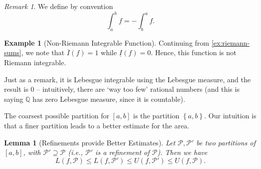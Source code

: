 \documentclass[11pt]{article}
\numberwithin{equation}{section}
\newtheorem{lemma}[theorem]{Lemma}
\theoremstyle{definition}
\newtheorem{example}[theorem]{Example}
\theoremstyle{remark}
\newtheorem{remark}[theorem]{Remark}
\newcommand{\pqty}[1]{\left(#1\right)}
\newcommand{\Bqty}[1]{\left\{#1\right\}}
\newcommand{\ccintv}[2]{[#1,#2]}
\newcommand{\QQ}{\mathbb Q}
\newcommand{\partition}{\mathcal P}
\newcommand{\upperSum}{U}
\newcommand{\lowerSum}{L}
\newcommand{\upperI}{\overline I}
\newcommand{\lowerI}{\underline I}
\begin{document}
\begin{remark}\label{analysis-unit-0142}
    We define by convention
    \[
        \int_{a}^{b} f = - \int_{b}^{a} f.
    \]
\end{remark}

\begin{example}[Non-Riemann Integrable Function]\label{analysis-unit-0143}
    \label{ex:non-riemann-integrable-fn}%
    Continuing from \autoref{ex:riemann-sums}, we note that \(\upperI\pqty{f} = 1\) while \(\lowerI\pqty{f} = 0\). Hence, this function is not Riemann integrable.
    
    Just as a remark, it is Lebesgue integrable using the Lebesgue measure, and the result is \(0\) -- intuitively, there are `way too few' rational numbers (and this is saying \(\QQ\) has zero Lebesgue measure, since it is countable).
\end{example}

The coarsest possible partition for \(\ccintv{a}{b}\) is the partition \(\Bqty{a, b}\). Our intuition is that a finer partition leads to a better estimate for the area.

\begin{lemma}[Refinements provide Better Estimates]\label{analysis-unit-0144}
    \label{lem:refinement-better-estimate}%
    Let \(\partition, \partition'\) be two partitions of \(\ccintv{a}{b}\), with \(\partition' \supseteq \partition\) (i.e., \(\partition'\) is a \emph{refinement} of \(\partition\)). Then we have
    \[
        \lowerSum\pqty{f, \partition} \leq \lowerSum\pqty{f, \partition'} \leq \upperSum\pqty{f, \partition'} \leq \upperSum\pqty{f, \partition}.
    \]
\end{lemma}
\end{document}
